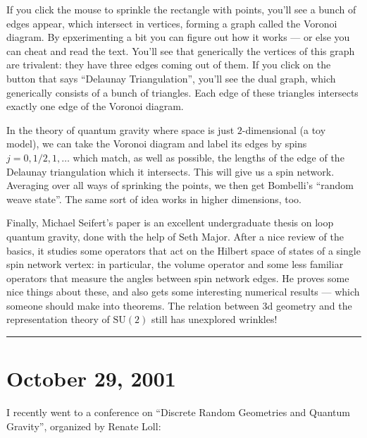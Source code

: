 \documentclass{article}
\def\tightlist{}
\renewcommand{\texttt}[1]{%
  \begingroup
  \ttfamily
  \begingroup\lccode`~=`/\lowercase{\endgroup\def~}{/\discretionary{}{}{}}%
  \begingroup\lccode`~=`[\lowercase{\endgroup\def~}{[\discretionary{}{}{}}%
  \begingroup\lccode`~=`.\lowercase{\endgroup\def~}{.\discretionary{}{}{}}%
  \catcode`/=\active\catcode`[=\active\catcode`.=\active
  \scantokens{#1\noexpand}%
  \endgroup
}
\begin{document}
If you click the mouse to sprinkle the rectangle with points, you'll see
a bunch of edges appear, which intersect in vertices, forming a graph
called the Voronoi diagram. By epxerimenting a bit you can figure out
how it works --- or else you can cheat and read the text. You'll see
that generically the vertices of this graph are trivalent: they have
three edges coming out of them. If you click on the button that says
``Delaunay Triangulation'', you'll see the dual graph, which generically
consists of a bunch of triangles. Each edge of these triangles
intersects exactly one edge of the Voronoi diagram.

In the theory of quantum gravity where space is just \(2\)-dimensional
(a toy model), we can take the Voronoi diagram and label its edges by
spins \(j = 0, 1/2, 1, \ldots\) which match, as well as possible, the
lengths of the edge of the Delaunay triangulation which it intersects.
This will give us a spin network. Averaging over all ways of sprinking
the points, we then get Bombelli's ``random weave state''. The same sort
of idea works in higher dimensions, too.

Finally, Michael Seifert's paper is an excellent undergraduate thesis on
loop quantum gravity, done with the help of Seth Major. After a nice
review of the basics, it studies some operators that act on the Hilbert
space of states of a single spin network vertex: in particular, the
volume operator and some less familiar operators that measure the angles
between spin network edges. He proves some nice things about these, and
also gets some interesting numerical results --- which someone should
make into theorems. The relation between 3d geometry and the
representation theory of \(\mathrm{SU}(2)\) still has unexplored
wrinkles!

\begin{center}\rule{0.5\linewidth}{0.5pt}\end{center}



\hypertarget{week172}{%
\section{October 29, 2001}\label{week172}}

I recently went to a conference on ``Discrete Random Geometries and
Quantum Gravity'', organized by Renate Loll:

\end{document}
